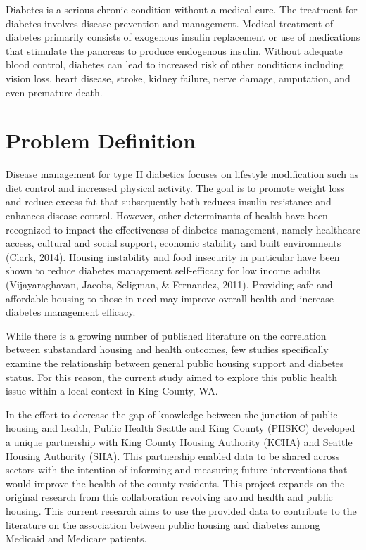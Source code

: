 \documentclass [11pt, proquest] {uwthesis}[2015/03/03]
\begin{document}
Diabetes is a serious chronic condition without a medical cure. The
treatment for diabetes involves disease prevention and management.
Medical treatment of diabetes primarily consists of exogenous insulin
replacement or use of medications that stimulate the pancreas to produce
endogenous insulin. Without adequate blood control, diabetes can lead to
increased risk of other conditions including vision loss, heart disease,
stroke, kidney failure, nerve damage, amputation, and even premature
death.

\section{Problem Definition}\label{problem-definition}

Disease management for type II diabetics focuses on lifestyle
modification such as diet control and increased physical activity. The
goal is to promote weight loss and reduce excess fat that subsequently
both reduces insulin resistance and enhances disease control. However,
other determinants of health have been recognized to impact the
effectiveness of diabetes management, namely healthcare access, cultural
and social support, economic stability and built environments (Clark,
2014). Housing instability and food insecurity in particular have been
shown to reduce diabetes management self-efficacy for low income adults
(Vijayaraghavan, Jacobs, Seligman, \& Fernandez, 2011). Providing safe
and affordable housing to those in need may improve overall health and
increase diabetes management efficacy.

While there is a growing number of published literature on the
correlation between substandard housing and health outcomes, few studies
specifically examine the relationship between general public housing
support and diabetes status. For this reason, the current study aimed to
explore this public health issue within a local context in King County,
WA.

In the effort to decrease the gap of knowledge between the junction of
public housing and health, Public Health Seattle and King County (PHSKC)
developed a unique partnership with King County Housing Authority (KCHA)
and Seattle Housing Authority (SHA). This partnership enabled data to be
shared across sectors with the intention of informing and measuring
future interventions that would improve the health of the county
residents. This project expands on the original research from this
collaboration revolving around health and public housing. This current
research aims to use the provided data to contribute to the literature
on the association between public housing and diabetes among Medicaid
and Medicare patients.
\end{document}
